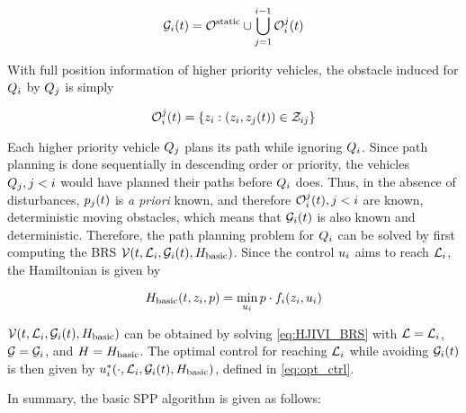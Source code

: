 \begin{equation}
\label{eq:obsseti}
\obsset_i(t)  = \soset \cup \bigcup_{j=1}^{i-1} \ioset_i^j(t)
\end{equation}

With full position information of higher priority vehicles, the obstacle induced for $Q_{i}$ by $Q_{j}$ is simply

\begin{equation}
\label{eq:ioset}
\ioset_i^j(t) = \{\state_i: (\state_i, \state_j(t)) \in \dz_{ij}\}
\end{equation}

Each higher priority vehicle $Q_{j}$ plans its path while ignoring $Q_{i}$. Since path planning is done sequentially in descending order or priority, the vehicles $Q_{j}, j<i$ would have planned their paths before $Q_{i}$ does. Thus, in the absence of disturbances, $p_j(t)$ is \textit{a priori} known, and therefore $\mathcal{O}_i^j(t), j<i$ are known, deterministic moving obstacles, which means that $\mathcal{G}_i(t)$ is also known and deterministic. Therefore, the path planning problem for $Q_{i}$ can be solved by first computing the BRS $\mathcal{V}(t, \mathcal{L}_i, \mathcal{G}_i(t), H_\text{basic})$. Since the control $u_i$ aims to reach $\mathcal{L}_i$, the Hamiltonian is given by

\begin{equation}
\label{eq:basicham}
\basicham(t, \state_i, p) = \min_{\ctrl_i} p \cdot \fdyn_i(\state_i, \ctrl_i)
\end{equation}

$\mathcal{V}(t, \mathcal{L}_i, \mathcal{G}_i(t), H_\text{basic})$ can be obtained by solving \eqref{eq:HJIVI_BRS} with $\mathcal{L} = \mathcal{L}_i$, $\mathcal{G} = \mathcal{G}_i$, and $H=H_\text{basic}$. The optimal control for reaching $\mathcal{L}_i$ while avoiding $\mathcal{G}_i(t)$ is then given by $u_i^*(\cdot, \mathcal{L}_i, \mathcal{G}_i(t), H_\text{basic})$, defined in \eqref{eq:opt_ctrl}.

In summary, the basic SPP algorithm is given as follows:

